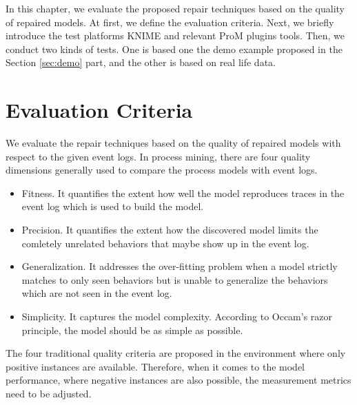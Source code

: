 In this chapter, we evaluate the proposed repair techniques based on the quality of repaired models. At first, we define the evaluation criteria. Next, we briefly introduce the test platforms KNIME and relevant ProM plugins tools. Then, we conduct two kinds of tests. One is based one the demo example proposed in the Section \ref{sec:demo} part, and the other is based on real life data. 
\section{Evaluation Criteria}
We evaluate the repair techniques based on the quality of repaired models with respect to the given event logs. In process mining, there are four quality dimensions generally used to compare the process models with event logs. 
\begin{itemize}
	\item Fitness. It quantifies the extent how well the model reproduces traces in the event log which is used to build the model.   
	\item Precision. It quantifies the extent how the discovered model limits the comletely unrelated behaviors that maybe show up in the event log. 
	\item Generalization. It addresses the over-fitting problem when a model strictly matches to only seen behaviors but is unable to generalize the behaviors which are not seen in the event log. 
	\item Simplicity. It captures the model complexity. According to Occam's razor principle, the model should be as simple as possible.
\end{itemize}
The four traditional quality criteria are proposed in the environment where only positive instances are available. Therefore, when it comes to the model performance, where negative instances are also possible, the measurement metrics need to be adjusted. 

